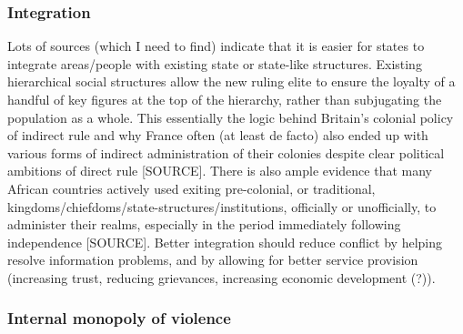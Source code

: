 \documentclass[12pt]{article}
\begin{document}
\begin{multicols}{2}
\subsubsection{Integration}

Lots of sources (which I need to find) indicate that it is easier for states to
integrate areas/people with existing state or state-like structures. Existing
hierarchical social structures allow the new ruling elite to ensure the loyalty
of a handful of key figures at the top of the hierarchy, rather than subjugating
the population as a whole. This essentially the logic behind Britain's colonial
policy of indirect rule and why France often (at least de facto) also ended up
with various forms of indirect administration of their colonies despite clear
political ambitions of direct rule [SOURCE]. There is also ample evidence that
many African countries actively used exiting pre-colonial, or traditional,
kingdoms/chiefdoms/state-structures/institutions, officially or unofficially, to
administer their realms, especially in the period immediately following
independence [SOURCE]. Better integration should reduce conflict by helping
resolve information problems, and by allowing for better service provision
(increasing trust, reducing grievances, increasing economic development (?)).

\subsubsection{Internal monopoly of violence}


\end{multicols}
\end{document}
